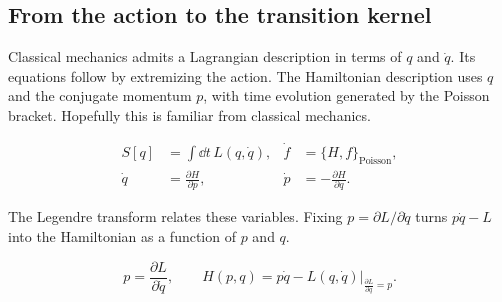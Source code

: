 \label{ch:253a-lagrangian-qm}

\subsection{From the action to the transition kernel}

Classical mechanics admits a Lagrangian description in terms of $q$ and $\dot q$. Its equations follow by extremizing the action. The Hamiltonian description uses $q$ and the conjugate momentum $p$, with time evolution generated by the Poisson bracket. Hopefully this is familiar from classical mechanics.

\begin{align}
  S[q]&=\int \dd t\,L(q,\dot q),
  &\dot f&=\{H,f\}_{\mathrm{Poisson}},
  \label{eq:253a-ch02-classical-descriptions}\\
  \dot q&=\frac{\partial H}{\partial p},
  &\dot p&=-\frac{\partial H}{\partial q}.
  \label{eq:253a-ch02-hamilton-equations}
\end{align}

The Legendre transform relates these variables. Fixing $p=\partial L/\partial\dot q$ turns $p\dot q-L$ into the Hamiltonian as a function of $p$ and $q$.

\begin{equation}
  p=\frac{\partial L}{\partial\dot q},
  \qquad
  H(p,q)=\left.p\dot q-L(q,\dot q)\right|_{\frac{\partial L}{\partial\dot q}=p}.
  \label{eq:253a-ch02-legendre-transform}
\end{equation}

